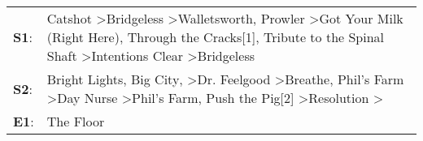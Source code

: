 \begin{supertabular}{p{0.03\textwidth}p{0.92\textwidth}}
 \textbf{S1}:  &             Catshot\textsuperscript{} \textgreater \enspace Bridgeless\textsuperscript{} \textgreater \enspace Walletsworth\textsuperscript{}, \enspace Prowler\textsuperscript{} \textgreater \enspace Got Your Milk (Right Here)\textsuperscript{}, \enspace Through the Cracks[1]\textsuperscript{}, \enspace Tribute to the Spinal Shaft\textsuperscript{} \textgreater \enspace Intentions Clear\textsuperscript{} \textgreater \enspace Bridgeless\textsuperscript{}  \enspace  \\
 \textbf{S2}:  &  Bright Lights, Big City\textsuperscript{}, \textsuperscript{} \textgreater \enspace Dr. Feelgood\textsuperscript{} \textgreater \enspace Breathe\textsuperscript{}, \enspace Phil's Farm\textsuperscript{} \textgreater \enspace Day Nurse\textsuperscript{} \textgreater \enspace Phil's Farm\textsuperscript{}, \enspace Push the Pig[2]\textsuperscript{} \textgreater \enspace Resolution\textsuperscript{} \textgreater {}\textsuperscript{}  \enspace  \\
 \textbf{E1}:  &                                                                                                                                                                                                                                                                                                                                                                                                                                                The Floor\textsuperscript{}  \enspace  \\
\end{supertabular}
